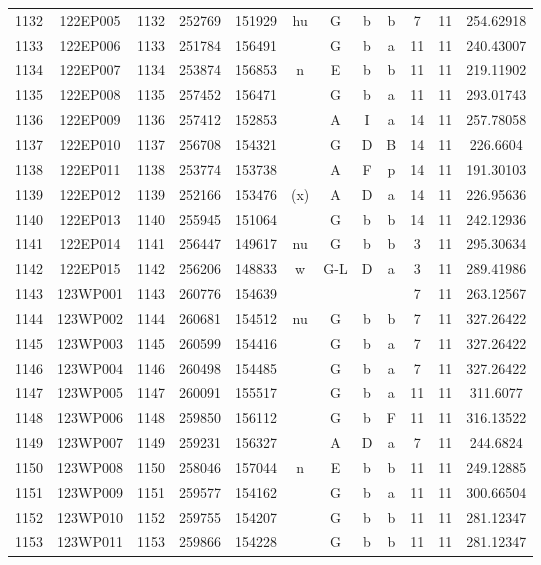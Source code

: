 \begin{tabular}{|*{12}{c|}}
1132 & 122EP005 & 1132 & 252769 & 151929 & hu & G & b & b & 7 & 11 & 254.62918 \\ 
1133 & 122EP006 & 1133 & 251784 & 156491 &  & G & b & a & 11 & 11 & 240.43007 \\ 
1134 & 122EP007 & 1134 & 253874 & 156853 & n & E & b & b & 11 & 11 & 219.11902 \\ 
1135 & 122EP008 & 1135 & 257452 & 156471 &  & G & b & a & 11 & 11 & 293.01743 \\ 
1136 & 122EP009 & 1136 & 257412 & 152853 &  & A & I & a & 14 & 11 & 257.78058 \\ 
1137 & 122EP010 & 1137 & 256708 & 154321 &  & G & D & B & 14 & 11 & 226.6604 \\ 
1138 & 122EP011 & 1138 & 253774 & 153738 &  & A & F & p & 14 & 11 & 191.30103 \\ 
1139 & 122EP012 & 1139 & 252166 & 153476 & (x) & A & D & a & 14 & 11 & 226.95636 \\ 
1140 & 122EP013 & 1140 & 255945 & 151064 &  & G & b & b & 14 & 11 & 242.12936 \\ 
1141 & 122EP014 & 1141 & 256447 & 149617 & nu & G & b & b & 3 & 11 & 295.30634 \\ 
1142 & 122EP015 & 1142 & 256206 & 148833 & w & G-L & D & a & 3 & 11 & 289.41986 \\ 
1143 & 123WP001 & 1143 & 260776 & 154639 &  &  &  &  & 7 & 11 & 263.12567 \\ 
1144 & 123WP002 & 1144 & 260681 & 154512 & nu & G & b & b & 7 & 11 & 327.26422 \\ 
1145 & 123WP003 & 1145 & 260599 & 154416 &  & G & b & a & 7 & 11 & 327.26422 \\ 
1146 & 123WP004 & 1146 & 260498 & 154485 &  & G & b & a & 7 & 11 & 327.26422 \\ 
1147 & 123WP005 & 1147 & 260091 & 155517 &  & G & b & a & 11 & 11 & 311.6077 \\ 
1148 & 123WP006 & 1148 & 259850 & 156112 &  & G & b & F & 11 & 11 & 316.13522 \\ 
1149 & 123WP007 & 1149 & 259231 & 156327 &  & A & D & a & 7 & 11 & 244.6824 \\ 
1150 & 123WP008 & 1150 & 258046 & 157044 & n & E & b & b & 11 & 11 & 249.12885 \\ 
1151 & 123WP009 & 1151 & 259577 & 154162 &  & G & b & a & 11 & 11 & 300.66504 \\ 
1152 & 123WP010 & 1152 & 259755 & 154207 &  & G & b & b & 11 & 11 & 281.12347 \\ 
1153 & 123WP011 & 1153 & 259866 & 154228 &  & G & b & b & 11 & 11 & 281.12347 \\ 

\end{tabular}
